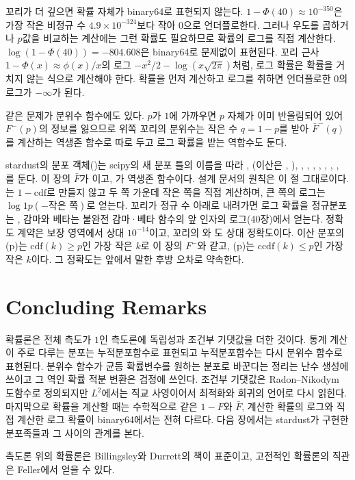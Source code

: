 꼬리가 더 깊으면 확률 자체가 binary64로 표현되지 않는다. $1-\Phi(40)\approx10^{-350}$은 가장 작은 비정규 수 $4.9\times10^{-324}$보다 작아 $0$으로 언더플로한다. 그러나 우도를 곱하거나 $p$값을 비교하는 계산에는 그런 확률도 필요하므로 확률의 로그를 직접 계산한다. $\log(1-\Phi(40))=-804.608$은 binary64로 문제없이 표현된다. 꼬리 근사 $1-\Phi(x)\approx\phi(x)/x$의 로그 $-x^2/2-\log(x\sqrt{2\pi})$처럼, 로그 확률은 확률을 거치지 않는 식으로 계산해야 한다. 확률을 먼저 계산하고 로그를 취하면 언더플로한 $0$의 로그가 $-\infty$가 된다.

같은 문제가 분위수 함수에도 있다. $p$가 $1$에 가까우면 $p$ 자체가 이미 반올림되어 있어 $F^{-}(p)$의 정보를 잃으므로 위쪽 꼬리의 분위수는 작은 수 $q=1-p$를 받아 $\bar F^{-}(q)$를 계산하는 역생존 함수로 따로 두고 로그 확률을 받는 역함수도 둔다.

\begin{instardust}
stardust의 분포 객체()는 scipy의 새 분포 틀의 이름을 따라 , (이산은 , ), , , , , , , , 를 둔다. 이 장의 $\bar F$가 이고, 가 역생존 함수이다. 설계 문서의 원칙은 이 절 그대로이다. 는 $1-\text{cdf}$로 만들지 않고 두 쪽 가운데 작은 쪽을 직접 계산하며, 큰 쪽의 로그는 $\log1p(-\text{작은 쪽})$로 얻는다. 꼬리가 정규 수 아래로 내려가면 로그 확률을 정규분포는 , 감마와 베타는 불완전 감마·베타 함수의 앞 인자의 로그(40장)에서 얻는다. 정확도 계약은 보장 영역에서 상대 $10^{-14}$이고, 꼬리의 와 도 상대 정확도이다. 이산 분포의 (p)는 $\text{cdf}(k)\ge p$인 가장 작은 $k$로 이 장의 $F^{-}$와 같고, (p)는 $\text{ccdf}(k)\le p$인 가장 작은 $k$이다. 그 정확도는 앞에서 말한 후방 오차로 약속한다.
\end{instardust}

\section{Concluding Remarks}

확률론은 전체 측도가 $1$인 측도론에 독립성과 조건부 기댓값을 더한 것이다. 통계 계산이 주로 다루는 분포는 누적분포함수로 표현되고 누적분포함수는 다시 분위수 함수로 표현된다. 분위수 함수가 균등 확률변수를 원하는 분포로 바꾼다는 정리는 난수 생성에 쓰이고 그 역인 확률 적분 변환은 검정에 쓰인다. 조건부 기댓값은 Radon--Nikodym 도함수로 정의되지만 $L^2$에서는 직교 사영이어서 최적화와 회귀의 언어로 다시 읽힌다. 마지막으로 확률을 계산할 때는 수학적으로 같은 $1-F$와 $\bar F$, 계산한 확률의 로그와 직접 계산한 로그 확률이 binary64에서는 전혀 다르다. 다음 장에서는 stardust가 구현한 분포족들과 그 사이의 관계를 본다.

측도론 위의 확률론은 Billingsley\cite{billingsley1995}와 Durrett\cite{durrett2019}의 책이 표준이고, 고전적인 확률론의 직관은 Feller\cite{feller1968}에서 얻을 수 있다.

\chapterreferences
